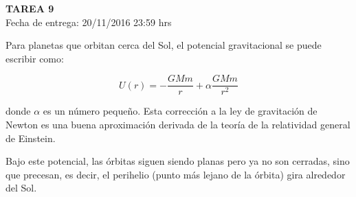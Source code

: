 \documentclass[letter, 11pt]{article}
\newcommand{\tareanro}{9}
\newcommand{\fechaentrega}{20/11/2016 23:59 hrs}
\begin{document}
\thispagestyle{firstpage}

\begin{center}
  {\uppercase{\LARGE \bf Tarea \tareanro}}\\
  Fecha de entrega: \fechaentrega
\end{center}



Para planetas que orbitan cerca del Sol, el potencial gravitacional se puede
escribir como:

$$U(r) = - \dfrac{GMm}{r} + \alpha\dfrac{GMm}{r^2}$$

\noindent donde $\alpha$ es un número pequeño. Esta corrección a la ley de gravitación de
Newton es una buena aproximación derivada de la teoría de la relatividad
general de Einstein.

Bajo este potencial, las órbitas siguen siendo planas pero ya no son cerradas,
sino que precesan, es decir, el perihelio (punto más lejano de la órbita) gira
alrededor del Sol.
\end{document}
